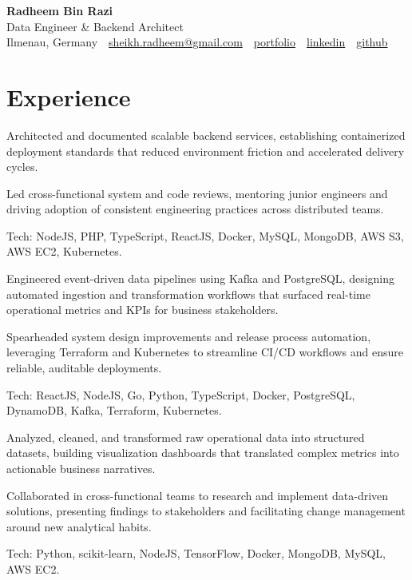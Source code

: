 \documentclass[11pt,a4paper]{resume}
\makeatletter
\newcommand{\Portfolio}{https://radheem.github.io/my-cv}
\newcommand{\PortfolioText}{portfolio}
\newcommand{\GitHub}{https://github.com/radheem}
\newcommand{\LinkedIn}{https://www.linkedin.com/in/radheem-razi}
\newcommand{\Email}{sheikh.radheem@gmail.com}
\makeatother
\begin{document}
\begin{center}
  {\huge\bfseries Radheem Bin Razi}\\[3pt]
  {\large Data Engineer \& Backend Architect}\\[6pt]
  \small
  Ilmenau, Germany \,\textbar\,
  \href{mailto:\Email}{\Email} \,\textbar\,
  \href{\Portfolio}{\PortfolioText} \,\textbar\,
  \href{\LinkedIn}{linkedin} \,\textbar\,
  \href{\GitHub}{github}
\end{center}
\vspace{2pt}

\section{Experience}

\bullets
  \item Architected and documented scalable backend services, establishing containerized deployment standards that reduced environment friction and accelerated delivery cycles.
  \item Led cross-functional system and code reviews, mentoring junior engineers and driving adoption of consistent engineering practices across distributed teams.
  \item Tech: NodeJS, PHP, TypeScript, ReactJS, Docker, MySQL, MongoDB, AWS S3, AWS EC2, Kubernetes.
\bulletsend
\vspace{3pt}
\bullets
  \item Engineered event-driven data pipelines using Kafka and PostgreSQL, designing automated ingestion and transformation workflows that surfaced real-time operational metrics and KPIs for business stakeholders.
  \item Spearheaded system design improvements and release process automation, leveraging Terraform and Kubernetes to streamline CI/CD workflows and ensure reliable, auditable deployments.
  \item Tech: ReactJS, NodeJS, Go, Python, TypeScript, Docker, PostgreSQL, DynamoDB, Kafka, Terraform, Kubernetes.
\bulletsend
\vspace{3pt}
\bullets
  \item Analyzed, cleaned, and transformed raw operational data into structured datasets, building visualization dashboards that translated complex metrics into actionable business narratives.
  \item Collaborated in cross-functional teams to research and implement data-driven solutions, presenting findings to stakeholders and facilitating change management around new analytical habits.
  \item Tech: Python, scikit-learn, NodeJS, TensorFlow, Docker, MongoDB, MySQL, AWS EC2.
\bulletsend
\vspace{3pt}
\end{document}
